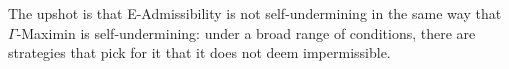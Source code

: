 \documentclass[a4paper]{article}
\newtheorem{proposition}[theorem]{Proposition}
\newcommand\D{\mathcal{D}}
\renewcommand\S{\mathcal{S}}
\newcommand\s{\mathsf{s}}
\renewcommand\P{\mathbb{P}} %
\newcommand\EU{\mathrm{EU}}
\newcommand\EAd{\mathrm{EAd}}
\newcommand{\IB}{\mathbb{B}}
\newcommand{\IP}{\P}
\newcommand{\pb}{b}
\newcommand{\todoinfo}[2][]{\todo[backgroundcolor=orange!80,bordercolor=black,linecolor=gray!80, #1,inline,caption={}]{#2}}
\renewcommand{\color}[1]{}
\newcommand{\Strategies}{\mathcal{S}}
\newcommand\SetDelimiter[1][]{
	\nonscript\,#1\vert \allowbreak \nonscript\,\mathopen{}}
\providecommand\given{\SetDelimiter}
\newcommand*\diff{\mathop{}\!\mathrm{d}}
\renewcommand{\geq}{\geqslant}
\newenvironment{CCM rewritten}
{\begingroup\color{blue}} %
{\endgroup}              %
\begin{document}
 
 
%	
The upshot is that E-Admissibility is not self-undermining in the same way that $\Gamma$-Maximin is self-undermining: under a broad range of conditions, there are strategies that pick for it that it does not deem impermissible.
\end{document}
